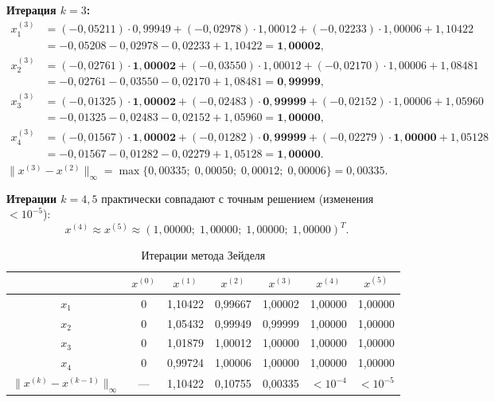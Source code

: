 \documentclass[a4paper, final]{article}
\begin{document}
\medskip\textbf{Итерация $k=3$:}
\begin{align*}
x_1^{(3)} &= (-0{,}05211)\cdot0{,}99949 + (-0{,}02978)\cdot1{,}00012 + (-0{,}02233)\cdot1{,}00006 + 1{,}10422\\
           &= -0{,}05208 - 0{,}02978 - 0{,}02233 + 1{,}10422 = \mathbf{1{,}00002},\\
x_2^{(3)} &= (-0{,}02761)\cdot\mathbf{1{,}00002} + (-0{,}03550)\cdot1{,}00012 + (-0{,}02170)\cdot1{,}00006 + 1{,}08481\\
           &= -0{,}02761 - 0{,}03550 - 0{,}02170 + 1{,}08481 = \mathbf{0{,}99999},\\
x_3^{(3)} &= (-0{,}01325)\cdot\mathbf{1{,}00002} + (-0{,}02483)\cdot\mathbf{0{,}99999} + (-0{,}02152)\cdot1{,}00006 + 1{,}05960\\
           &= -0{,}01325 - 0{,}02483 - 0{,}02152 + 1{,}05960 = \mathbf{1{,}00000},\\
x_4^{(3)} &= (-0{,}01567)\cdot\mathbf{1{,}00002} + (-0{,}01282)\cdot\mathbf{0{,}99999}
             + (-0{,}02279)\cdot\mathbf{1{,}00000} + 1{,}05128\\
           &= -0{,}01567 - 0{,}01282 - 0{,}02279 + 1{,}05128 = \mathbf{1{,}00000}.
\end{align*}
$\|x^{(3)}-x^{(2)}\|_\infty = \max\{0{,}00335;\;0{,}00050;\;0{,}00012;\;0{,}00006\} = 0{,}00335.$

\medskip\textbf{Итерации $k=4,5$} практически совпадают с точным решением
(изменения $< 10^{-5}$):
\[
x^{(4)} \approx x^{(5)} \approx (1{,}00000;\;1{,}00000;\;1{,}00000;\;1{,}00000)^T.
\]

\begin{table}[h!]
\centering
\caption{Итерации метода Зейделя}
\label{tab:seidel}
\renewcommand{\arraystretch}{1.3}
\begin{tabular}{|c|c|c|c|c|c|c|}
\hline
 & $x^{(0)}$ & $x^{(1)}$ & $x^{(2)}$ & $x^{(3)}$ & $x^{(4)}$ & $x^{(5)}$ \\
\hline
$x_1$ & 0 & 1,10422 & 0,99667 & 1,00002 & 1,00000 & 1,00000 \\
$x_2$ & 0 & 1,05432 & 0,99949 & 0,99999 & 1,00000 & 1,00000 \\
$x_3$ & 0 & 1,01879 & 1,00012 & 1,00000 & 1,00000 & 1,00000 \\
$x_4$ & 0 & 0,99724 & 1,00006 & 1,00000 & 1,00000 & 1,00000 \\
\hline
$\|x^{(k)}-x^{(k-1)}\|_\infty$ & --- & 1,10422 & 0,10755 & 0,00335 & $<10^{-4}$ & $<10^{-5}$ \\
\hline
\end{tabular}
\end{table}
\end{document}
